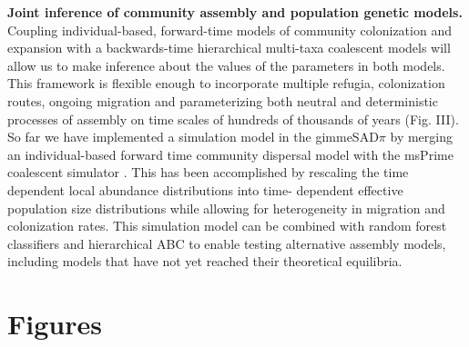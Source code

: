\documentclass[12pt]{article}
\begin{document}
{\begin{minipage}{0.97\textwidth}
    {\bf Joint inference of community assembly and population genetic
      models.} Coupling individual-based, forward-time models of
    community colonization and expansion with a backwards-time
    hierarchical multi-taxa coalescent models will allow us to make
    inference about the values of the parameters in both models. This
    framework is flexible enough to incorporate multiple refugia,
    colonization routes, ongoing migration and parameterizing both
    neutral and deterministic processes of assembly on time scales of
    hundreds of thousands of years (Fig. III). So far we have
    implemented a simulation model in the gimmeSAD$\pi$
    \citep{overcast} by merging an individual-based forward time
    community dispersal model \citep{rosindel} with the msPrime
    coalescent simulator \citep{msPrime}. This has been accomplished
    by rescaling the time dependent local abundance distributions into
    time- dependent effective population size distributions while
    allowing for heterogeneity in migration and colonization
    rates. This simulation model can be combined with random forest
    classifiers and hierarchical ABC to enable testing alternative
    assembly models, including models that have not yet reached their
    theoretical equilibria.
  \end{minipage}
}

\pagebreak

\section*{Figures}
\end{document}
